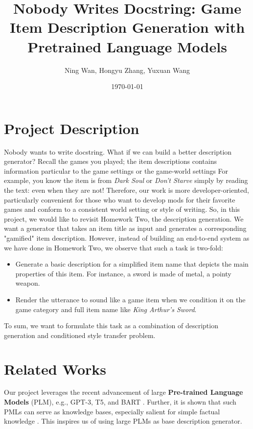 \documentclass[12pt]{article}
\title{\textbf{Nobody Writes Docstring:} Game Item Description Generation with Pretrained Language Models}
\author{Ning Wan, Hongyu Zhang, Yuxuan Wang}
\date{\today}
\begin{document}
\maketitle

\section{\bf Project Description}
  Nobody wants to write docstring. What if we can build a better description generator? 
    Recall the games you played; the item descriptions contains information particular to 
    the game settings or the game-world settings For example, you know the item is from \textit{Dark Soul} or \textit{Don't Starve} 
    simply by reading the text: even when they are not! Therefore, our work is more 
    developer-oriented, particularly convenient for those who want to develop mods for 
    their favorite games and conform to a consistent world setting or style of writing. So, in this project, 
    we would like to revisit Homework Two, the description generation. 
    We want a generator that takes an item title as input and generates a 
    corresponding "gamified" item description. However, instead of building an 
    end-to-end system as we have done in Homework Two, we observe that such a task 
    is two-fold:
    \begin{itemize}
      \item Generate a basic description for a simplified item name that depicts the main properties of this item. 
        For instance, a sword is made of metal, a pointy weapon.
      \item Render the utterance to sound like a game item when we condition it on the game category and full 
        item name like \textit{King Arthur's Sword}.
    \end{itemize}
    To sum, we want to formulate this task as a combination of description generation and conditioned style transfer problem.
 
\section{Related Works}
  Our project leverages the recent advancement of large \textbf{Pre-trained Language Models} (PLM), e.g., 
    GPT-3, T5, and BART \cite{gpt-3, t5, bart}. Further, it is shown that such PMLs can serve as knowledge bases, 
    especially salient for simple factual knowledge \cite{comet, kblm}. This inspires us of using large PLMs as 
    base description generator.
\end{document}
